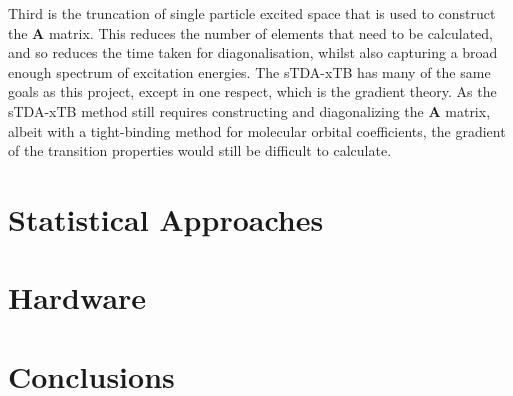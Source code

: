 Third is the truncation of single particle excited space that is used to construct 
the $\mathbf{A}$ matrix. This reduces the number of elements that need to be 
calculated, and so reduces the time taken for diagonalisation, whilst also capturing 
a broad enough spectrum of excitation energies. The sTDA-xTB has many of the same 
goals as this project, except in one respect, which is the gradient theory. As 
the sTDA-xTB method still requires constructing and diagonalizing the $\mathbf{A}$ 
matrix, albeit with a tight-binding method for molecular orbital coefficients, 
the gradient of the transition properties would still be difficult to calculate.

\section{Statistical Approaches}
\label{sec:stats_models}



\section{Hardware}
\label{}

\section{Conclusions}
\label{sec:lit_review_conclusions}
